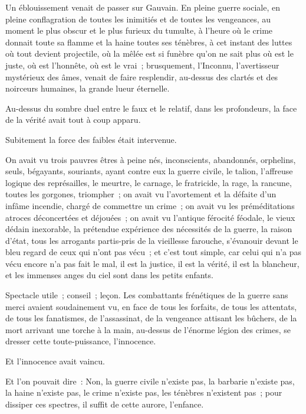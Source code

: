 \documentclass[french,twoside]{book} %
\begin{document}
Un éblouissement venait de passer sur Gauvain. En pleine guerre sociale, en pleine conflagration de toutes les inimitiés et de toutes les vengeances, au  moment le plus obscur et le plus furieux du tumulte, à l’heure où le crime donnait toute sa flamme et la haine toutes ses ténèbres, à cet instant des luttes où tout devient projectile, où la mêlée est si funèbre qu’on ne sait plus où est le juste, où est l’honnête, où est le vrai ; brusquement, l’Inconnu, l’avertisseur mystérieux des âmes, venait de faire resplendir, au-dessus des clartés et des noirceurs humaines, la grande lueur éternelle.\par
Au-dessus du sombre duel entre le faux et le relatif, dans les profondeurs, la face de la vérité avait tout à coup apparu.\par
Subitement la force des faibles était intervenue.\par
On avait vu trois pauvres êtres à peine nés, inconscients, abandonnés, orphelins, seuls, bégayants, souriants, ayant contre eux la guerre civile, le talion, l’affreuse logique des représailles, le meurtre, le carnage, le fratricide, la rage, la rancune, toutes les gorgones, triompher ; on avait vu l’avortement et la défaite d’un infâme incendie, chargé de commettre un crime ; on avait vu les préméditations atroces déconcertées et déjouées ; on avait vu l’antique férocité féodale, le vieux dédain inexorable, la prétendue expérience des nécessités de la guerre, la raison d’état, tous les arrogants partis-pris de la vieillesse farouche, s’évanouir devant le bleu regard de ceux qui n’ont pas vécu ; et c’est tout simple, car celui qui n’a pas vécu encore n’a pas fait le mal, il est la justice, il est la vérité, il est la blancheur, et les immenses anges du ciel sont dans les petits enfants.\par
 Spectacle utile ; conseil ; leçon. Les combattants frénétiques de la guerre sans merci avaient soudainement vu, en face de tous les forfaits, de tous les attentats, de tous les fanatismes, de l’assassinat, de la vengeance attisant les bûchers, de la mort arrivant une torche à la main, au-dessus de l’énorme légion des crimes, se dresser cette toute-puissance, l’innocence.\par
Et l’innocence avait vaincu.\par
Et l’on pouvait dire : Non, la guerre civile n’existe pas, la barbarie n’existe pas, la haine n’existe pas, le crime n’existe pas, les ténèbres n’existent pas ; pour dissiper ces spectres, il suffit de cette aurore, l’enfance.\par
\end{document}
